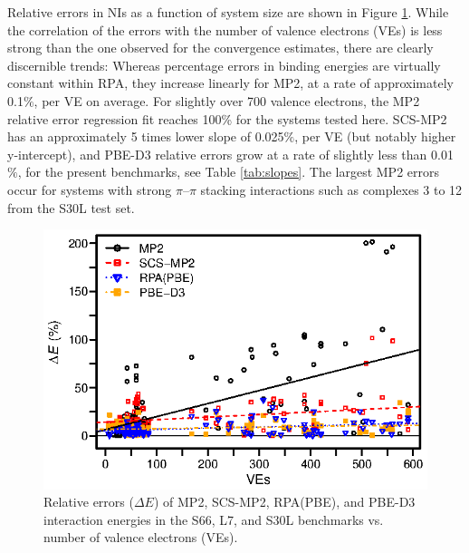 \documentclass[journal=jctcce,manuscript=article]{achemso}
\begin{document}
Relative errors in NIs as a function of system size are shown in
Figure \ref{fig:mp2_rpa_comp}. While the correlation of the errors with
the number of valence electrons (VEs) is
less strong than the one observed for the convergence estimates, there
are clearly discernible trends: Whereas percentage errors in binding
energies are virtually constant within RPA, they increase linearly for
MP2, at a rate of approximately 0.1$\%$, per VE
on average. For slightly over 700 valence electrons, the MP2 relative error 
regression fit reaches 100\% for the systems tested here. SCS-MP2 has an
approximately 5 times lower slope of 0.025$\%$, per VE
(but notably higher y-intercept), and PBE-D3 relative errors grow
at a rate of slightly less than 0.01$\%$, for the present
benchmarks, see Table \ref{tab:slopes}. The largest MP2 errors occur for
systems with strong $\pi$--$\pi$ stacking interactions such as complexes 3
to 12 from the S30L test set.\cite{Sure15JChemTheoryComput}

\begin{figure}[hbpt]
  \centering
  \includegraphics{mp2_rpa_signed.eps}
  \caption{Relative errors ($\Delta E$) of MP2, SCS-MP2, RPA(PBE), and
    PBE-D3 interaction energies in the
    S66,\cite{doi:10.1021/ct2002946,doi:10.1021/ct200523a} 
    L7,\cite{doi:10.1021/ct400036b} and
    S30L\cite{Sure15JChemTheoryComput} benchmarks vs.
    number of valence electrons (VEs).}
  \label{fig:mp2_rpa_comp}
\end{figure}
\end{document}
